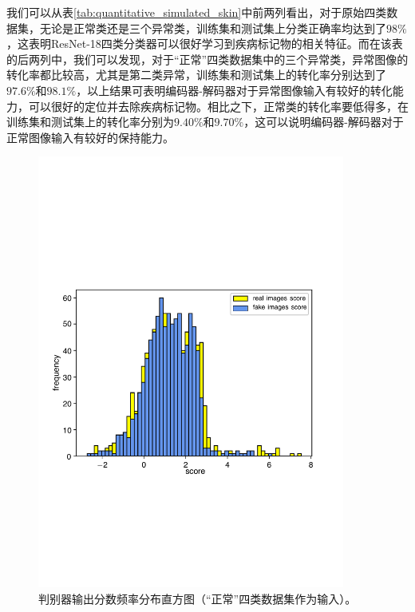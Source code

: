 我们可以从表\ref{tab:quantitative_simulated_skin}中前两列看出，对于原始四类数据集，无论是正常类还是三个异常类，训练集和测试集上分类正确率均达到了$98\%$，这表明ResNet-18四类分类器可以很好学习到疾病标记物的相关特征。而在该表的后两列中，我们可以发现，对于“正常”四类数据集中的三个异常类，异常图像的转化率都比较高，尤其是第二类异常，训练集和测试集上的转化率分别达到了$97.6\%$和$98.1\%$，以上结果可表明编码器-解码器对于异常图像输入有较好的转化能力，可以很好的定位并去除疾病标记物。相比之下，正常类的转化率要低得多，在训练集和测试集上的转化率分别为$9.40\%$和$9.70\%$，这可以说明编码器-解码器对于正常图像输入有较好的保持能力。
\begin{figure}[h]
	\centering
	\includegraphics[width=0.9\textwidth]{figure/simulated_skin_score_distribution.pdf}
	\caption[判别器输出分数频率分布直方图（“正常”四类数据集作为输入）]{判别器输出分数频率分布直方图（“正常”四类数据集作为输入）。}
	\label{fig:simulated_skin_hist_freq}
\end{figure}

